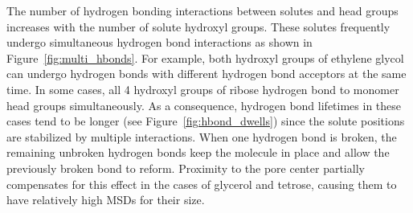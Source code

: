 \documentclass[journal=jpcbfk,manuscript=article]{achemso}
\begin{document}
  The number of hydrogen bonding interactions between solutes and head groups
  increases with the number of solute hydroxyl groups. These solutes frequently
  undergo simultaneous hydrogen bond interactions as shown in 
  Figure~\ref{fig:multi_hbonds}. For example, both hydroxyl groups of ethylene
  glycol can undergo hydrogen bonds with different hydrogen bond acceptors at 
  the same time. In some cases, all 4 hydroxyl groups of ribose hydrogen bond
  to monomer head groups simultaneously. As a consequence, hydrogen bond 
  lifetimes in these cases tend to be longer (see Figure~\ref{fig:hbond_dwells})
  since the solute positions are stabilized by multiple interactions. When one
  hydrogen bond is broken, the remaining unbroken hydrogen bonds keep the 
  molecule in place and allow the previously broken bond to reform.
  Proximity to the pore center partially compensates for this effect in
  the cases of glycerol and tetrose, causing them to have relatively high MSDs
  for their size.
  
\end{document}
